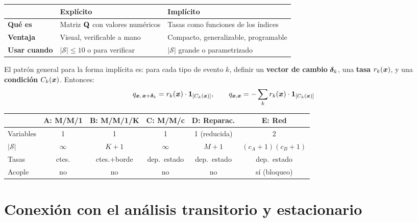 \documentclass[11pt, letterpaper]{article}
\begin{document}
\begin{center}\small
\renewcommand{\arraystretch}{1.3}
\begin{tabularx}{\textwidth}{>{\bfseries}l X X}\toprule
& \textbf{Expl\'icito} & \textbf{Impl\'icito} \\\midrule
Qu\'e es & Matriz $\mathbf{Q}$ con valores num\'ericos & Tasas como funciones de los \'indices \\
Ventaja & Visual, verificable a mano & Compacto, generalizable, programable \\
Usar cuando & $|\mathcal{S}|\le 10$ o para verificar & $|\mathcal{S}|$ grande o parametrizado \\\bottomrule
\end{tabularx}
\end{center}

El patr\'on general para la forma impl\'icita es: para cada tipo de evento $k$, definir un \textbf{vector de cambio} $\boldsymbol{\delta}_k$, una \textbf{tasa} $r_k(\boldsymbol{x})$, y una \textbf{condici\'on} $C_k(\boldsymbol{x})$. Entonces:
\[
q_{\boldsymbol{x},\,\boldsymbol{x}+\boldsymbol{\delta}_k} = r_k(\boldsymbol{x})\cdot\mathbf{1}_{[C_k(\boldsymbol{x})]}, \qquad q_{\boldsymbol{x},\boldsymbol{x}} = -\sum_k r_k(\boldsymbol{x})\cdot\mathbf{1}_{[C_k(\boldsymbol{x})]}
\]

\begin{notabox}
\begin{center}\footnotesize
\renewcommand{\arraystretch}{1.2}
\begin{tabular}{lccccc}\toprule
& \textbf{A: M/M/1} & \textbf{B: M/M/1/K} & \textbf{C: M/M/c} & \textbf{D: Reparac.} & \textbf{E: Red} \\\midrule
Variables & 1 & 1 & 1 & 1 (reducida) & 2 \\
$|\mathcal{S}|$ & $\infty$ & $K{+}1$ & $\infty$ & $M{+}1$ & $(c_A{+}1)(c_B{+}1)$ \\
Tasas & ctes. & ctes.+borde & dep.\ estado & dep.\ estado & dep.\ estado \\
Acople & no & no & no & no & s\'i (bloqueo) \\\bottomrule
\end{tabular}
\end{center}
\end{notabox}

\section{Conexión con el análisis transitorio y estacionario}
\end{document}
